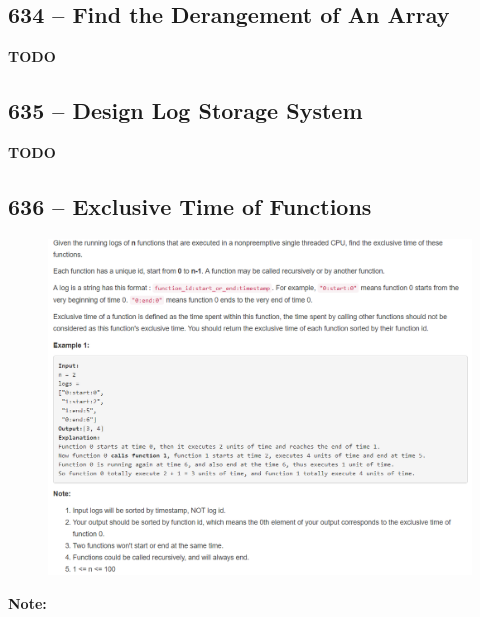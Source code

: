 \documentclass[a4paper,12pt]{article}
\begin{document}
\subsection{634 -- Find the Derangement of An Array}
\textbf{\Huge{TODO}}

\subsection{635 -- Design Log Storage System}
\textbf{\Huge{TODO}}

\subsection{636 -- Exclusive Time of Functions}
\begin{figure}[H]
	\begin{center}
		\includegraphics[width=18cm]{636.png}
	\end{center}
\end{figure}
\textbf{\large{Note:}}
\par
\vspace{0.5em}
\end{document}
